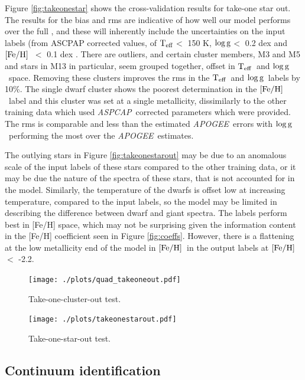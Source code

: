 \documentclass[12pt, preprint]{aastex}
\newcommand{\teff}{\mbox{$\rm T_{eff}$}}
\newcommand{\feh}{\mbox{$\rm [Fe/H]$}}
\newcommand{\logg}{\mbox{$\rm \log g$}}
\newcommand{\apogee}{\textsl{APOGEE}}
\newcommand{\aspcap}{\textsl{ASPCAP}}
\begin{document}
Figure \ref{fig:takeonestar} shows the cross-validation results for take-one star out. The results for the bias and rms are indicative of how well our model performs over the full , and these will inherently include the uncertainties on the input labels (from ASCPAP corrected values, of \teff $<$ 150 K, \logg $<$ 0.2 dex and \feh\ $<$ 0.1 dex \citep{Meszaros2013}. There are outliers, and certain cluster members, M3 and M5 and stars in M13 in particular, seem grouped together, offset in \teff\ and \logg\ space. Removing these clusters improves the rms in the \teff\ and \logg\ labels by 10\%. The single dwarf cluster shows the poorest determination in the \feh\ label and this cluster was set at a single metallicity, dissimilarly to the other training data which used \aspcap\ corrected parameters which were provided. The rms is comparable and less than the estimated \apogee\ errors with \logg\ performing the most over the \apogee\ estimates.  

The outlying stars in Figure \ref{fig:takeonestarout} may be due to an anomalous scale of the input labels of these stars compared to the other training data, or it may be due the nature of the spectra of these stars, that is not accounted for in the model. Similarly, the temperature of the dwarfs is offset low at increasing temperature, compared to the input labels, so the model may be limited in describing the difference between dwarf and giant spectra. The labels perform best in [Fe/H] space, which may not be surprising given the information content in the [Fe/H] coefficient seen in Figure \ref{fig:coeffs}. However, there is a flattening at the low metallicity end of the model in \feh\ in the output labels at \feh\ $<$ -2.2. 

\begin{figure}[h!]
\centering
  \texttt{[image: ./plots/quad\_takeoneout.pdf]}
\caption{Take-one-cluster-out test.}
\label{fig:takeoneout}
\end{figure}

\begin{figure}[h!]
\centering
  \texttt{[image: ./plots/takeonestarout.pdf]}
\caption{Take-one-star-out test.}
\label{fig:takeoneout}
\end{figure}


\subsection{Continuum identification}
\end{document}
